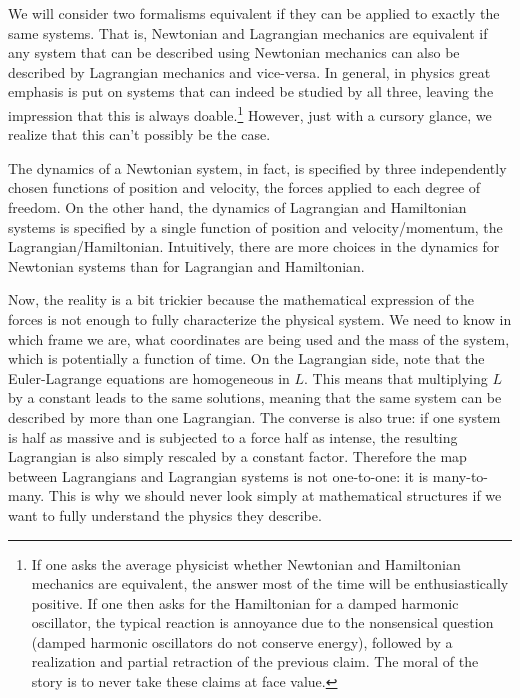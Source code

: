 We will consider two formalisms equivalent if they can be applied to exactly the same systems. That is, Newtonian and Lagrangian mechanics are equivalent if any system that can be described using Newtonian mechanics can also be described by Lagrangian mechanics and vice-versa. In general, in physics great emphasis is put on systems that can indeed be studied by all three, leaving the impression that this is always doable.\footnote{If one asks the average physicist whether Newtonian and Hamiltonian mechanics are equivalent, the answer most of the time will be  enthusiastically positive. If one then asks for the Hamiltonian for a damped harmonic oscillator, the typical reaction is annoyance due to the nonsensical question (damped harmonic oscillators do not conserve energy), followed by a realization and partial retraction of the previous claim. The moral of the story is to never take these claims at face value.} However, just with a cursory glance, we realize that this can't possibly be the case.

The dynamics of a Newtonian system, in fact, is specified by three independently chosen functions of position and velocity, the forces applied to each degree of freedom. On the other hand, the dynamics of Lagrangian and Hamiltonian systems is specified by a single function of position and velocity/momentum, the Lagrangian/Hamiltonian. Intuitively, there are more choices in the dynamics for Newtonian systems than for Lagrangian and Hamiltonian.

Now, the reality is a bit trickier because the mathematical expression of the forces is not enough to fully characterize the physical system. We need to know in which frame we are, what coordinates are being used and the mass of the system, which is potentially a function of time. On the Lagrangian side, note that the Euler-Lagrange equations are homogeneous in $L$. This means that multiplying $L$ by a constant leads to the same solutions, meaning that the same system can be described by more than one Lagrangian. The converse is also true: if one system is half as massive and is subjected to a force half as intense, the resulting Lagrangian is also simply rescaled by a constant factor. Therefore the map between Lagrangians and Lagrangian systems is not one-to-one: it is many-to-many. This is why we should never look simply at mathematical structures if we want to fully understand the physics they describe.

